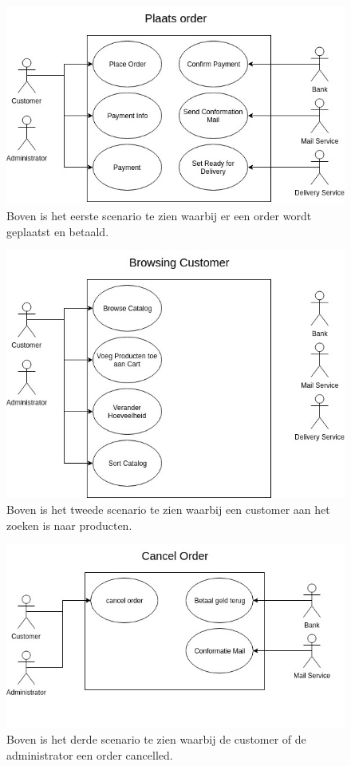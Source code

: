 \documentclass[•]{article}
\begin{document}
\begin{figure}
\centering
\includegraphics[width=13.5cm]{scenario1_plaatsOrder.jpg}
\caption{Boven is het eerste scenario te zien waarbij er een order wordt geplaatst en betaald.}
\label{scenario1}
\end{figure}
\begin{figure}
\centering
\includegraphics[width=13.5cm]{scenario2_browsingCustomer.jpg}
\caption{Boven is het tweede scenario te zien waarbij een customer aan het zoeken is naar producten.}
\label{scenario2}
\end{figure}
\begin{figure}
\centering
\includegraphics[width=13.5cm]{scenario3_cancelOrderAfterPayment.jpeg}
\caption{Boven is het derde scenario te zien waarbij de customer of de administrator een order cancelled.}
\label{scenario3}
\end{figure}
\end{document}
